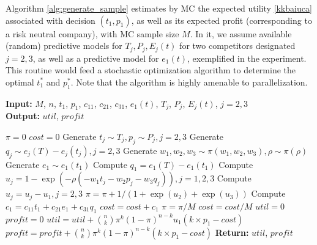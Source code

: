 \documentclass[a4paper,fleqn, 11pt]{cas-sc}
\begin{document}
  Algorithm \ref{alg:generate_sample}
  estimates by MC 
  the expected utility \eqref{kkbaiuca} associated with decision $(t_1,p_1)$, as well as its expected profit (corresponding to a risk neutral company), with MC sample size $M$.
  In it, we assume available (random) predictive models for $T_j, P_j, E_j(t)$ for 
   two competitors designated $j=2,3$, as well as a predictive model 
    for $e_1(t)$, exemplified 
    in the experiment. 
 This routine would feed a stochastic optimization algorithm 
 to determine the optimal $t_1^*$ and $p_1^*$. 
 Note that the algorithm is highly amenable to parallelization. 





\begin{algorithm}
\caption{} 
\label{alg:generate_sample}
\textbf{Input:} $M$, $n$, $t_1 $, $p_1 $, $c_{11}$, $c_{21}$, $c_{31}$, $e_1(t)$, $T_j$, $P_j$, $E_j(t)$, $j=2,3$  \\
\textbf{Output:} $util$, $profit$
\begin{algorithmic}[1]
\State $\pi = 0$
\State $cost = 0$
\State Generate $t_j \sim T_j, p_j \sim P_j, j=2,3$ 
\State Generate $q_j \sim e_j (T) - e_j (t_j) , j=2,3$ 
\State Generate $w_1, w_2 , w_3 \sim \pi(w_1, w_2 , w_3), \rho \sim \pi(\rho)$ 
\State Generate $e_1 \sim e_1(t_1)$ 
\State Compute $q_1=e_1(T) - e_1(t_1) $ 
\State Compute $u_j= 1-\exp (-\rho (-w_1 t_j -w_2 p_j - w_3 q_j)),
j=1, 2,3$
\State Compute $u_j =u_j - u_1, j=2,3$
\State $\pi = \pi  + 1 / (1 + \exp (u_2) + \exp (u_3)) $
\State Compute $c_1 = c_{11} t_1 + c_{21} e_1 + c_{31} q_1$
\State $cost = cost + c_1$
\EndFor
\State $\pi = \pi / M$
\State $cost = cost / M$
\State $util=0$
\State $profit=0$
\State  $ util = util + \binom{n}{k} \pi^k (1-\pi ) ^{n-k} 
u_1 (k\times p_1 - cost) $
\State  $ profit = profit + \binom{n}{k} \pi^k (1-\pi ) ^{n-k} 
 (k\times p_1 - cost) $
\EndFor
\State \textbf{Return:}  $util$, $profit$
\end{algorithmic}
\end{algorithm} 



\end{document}

